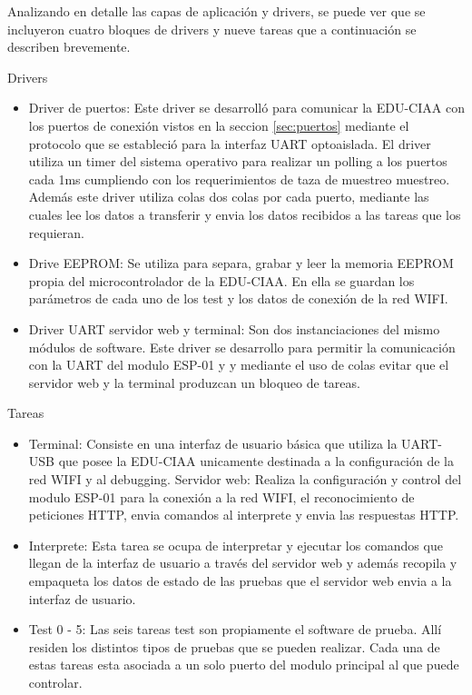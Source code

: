 Analizando en detalle las capas de aplicación y drivers, se puede ver que se incluyeron cuatro bloques de drivers y nueve tareas que a continuación se describen brevemente.

Drivers
\begin{itemize}
	\item Driver de puertos: Este driver se desarrolló para comunicar la EDU-CIAA con los puertos de conexión vistos en la seccion \ref{sec:puertos} mediante el protocolo que se estableció para la interfaz UART optoaislada. El driver utiliza un timer del sistema operativo para realizar un polling a los puertos cada 1ms cumpliendo con los requerimientos de taza de muestreo muestreo. Además este driver utiliza colas dos colas por cada puerto, mediante las cuales lee los datos a transferir y envia los datos recibidos a las tareas que los requieran.
	\item Drive EEPROM: Se utiliza para separa, grabar y leer la memoria EEPROM propia del microcontrolador de la EDU-CIAA. En ella se guardan los parámetros de cada uno de los test y los datos de conexión de la red WIFI.
	\item Driver UART servidor web y terminal: Son dos instanciaciones del mismo módulos de software. Este driver se desarrollo para permitir la comunicación con la UART del modulo ESP-01 y y mediante el uso de colas evitar que el servidor web y la terminal produzcan un bloqueo de tareas.
\end{itemize}
	
Tareas
\begin{itemize}
	\item Terminal: Consiste en una interfaz de usuario básica que utiliza la UART-USB que posee la EDU-CIAA unicamente destinada a la configuración de la red WIFI y al debugging.
Servidor web: Realiza la configuración y control del modulo ESP-01 para la conexión a la red WIFI, el reconocimiento de peticiones HTTP, envia comandos al interprete y envia las respuestas HTTP. 
	\item Interprete: Esta tarea se ocupa de interpretar y ejecutar los comandos que llegan de la interfaz de usuario a través del servidor web y además recopila y empaqueta los datos de estado de las pruebas que el servidor web envia a la interfaz de usuario.
	\item Test 0 - 5: Las seis tareas test son propiamente el software de prueba. Allí residen los distintos tipos de pruebas que se pueden realizar. Cada una de estas tareas esta asociada a un solo puerto del modulo principal al que puede controlar.
\end{itemize}	
	
